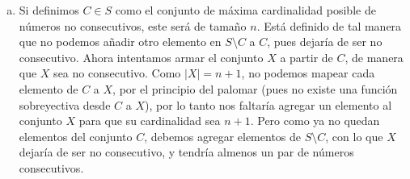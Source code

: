 \begin{enumerate}[a)]
    \item Si definimos $C \in S$ como el conjunto de máxima cardinalidad posible de números no consecutivos, este será de tamaño $n$. Está definido de tal manera que no podemos añadir otro elemento en $S \setminus C$ a $C$, pues dejaría de ser no consecutivo. Ahora intentamos armar el conjunto $X$ a partir de $C$, de manera que $X$ sea no consecutivo. Como $\vert X \vert = n + 1$, no podemos mapear cada elemento de $C$ a $X$, por el principio del palomar (pues no existe una función sobreyectiva desde $C$ a $X$), por lo tanto nos faltaría agregar un elemento al conjunto $X$ para que su cardinalidad sea $n+1$. Pero como ya no quedan elementos del conjunto $C$, debemos agregar elementos de $S \setminus C$, con lo que $X$ dejaría de ser no consecutivo, y tendría almenos un par de números consecutivos. 

   
\end{enumerate}
